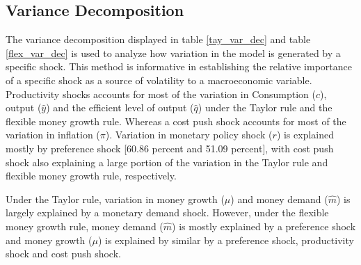 \documentclass[11pt,preprint, authoryear]{elsarticle}
\numberwithin{equation}{section}
\numberwithin{figure}{section}
\numberwithin{table}{section}
\begin{document}
\hypertarget{variance-decomposition}{%
\subsection{Variance Decomposition}\label{variance-decomposition}}

The variance decomposition displayed in table \ref{tay_var_dec} and
table \ref{flex_var_dec} is used to analyze how variation in the model
is generated by a specific shock. This method is informative in
establishing the relative importance of a specific shock as a source of
volatility to a macroeconomic variable. Productivity shocks accounts for
most of the variation in Consumption (\(c\)), output (\(\hat{y}\)) and
the efficient level of output (\(\hat{q}\)) under the Taylor rule and
the flexible money growth rule. Whereas a cost push shock accounts for
most of the variation in inflation (\(\pi\)). Variation in monetary
policy shock (\(r\)) is explained mostly by preference shock {[}60.86
percent and 51.09 percent{]}, with cost push shock also explaining a
large portion of the variation in the Taylor rule and flexible money
growth rule, respectively.

Under the Taylor rule, variation in money growth (\(\mu\)) and money
demand (\(\hat{m}\)) is largely explained by a monetary demand shock.
However, under the flexible money growth rule, money demand
(\(\hat{m}\)) is mostly explained by a preference shock and money growth
(\(\mu\)) is explained by similar by a preference shock, productivity
shock and cost push shock.
\end{document}
